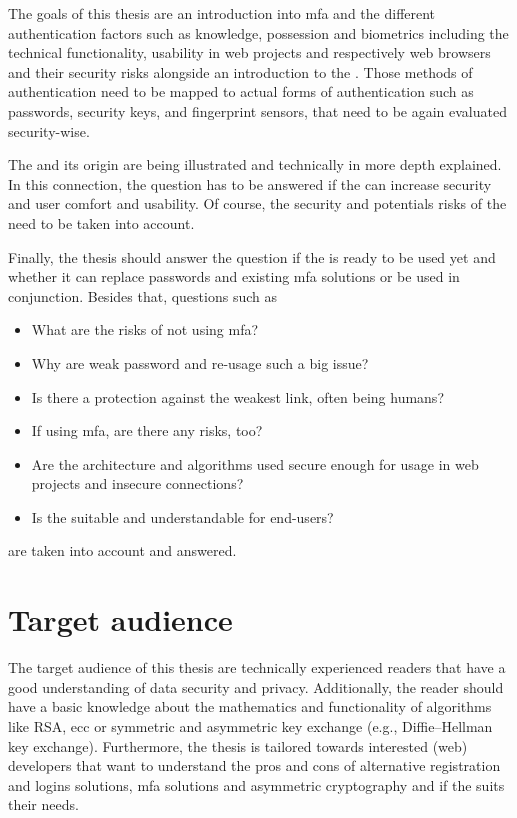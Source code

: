 The goals of this thesis are an introduction into \gls{mfa} and the different authentication factors such as \frqq knowledge, possession and biometrics\flqq{} including the technical functionality, usability in web projects and respectively web browsers and their security risks alongside an introduction to the \wa. Those methods of authentication need to be mapped to actual forms of authentication such as passwords, security keys, and fingerprint sensors, that need to be again evaluated security-wise.

The \wa{} and its origin are being illustrated and technically in more depth explained. In this connection, the question has to be answered if the \wa{} can increase security and user comfort and usability. Of course, the security and potentials risks of the \wa{} need to be taken into account.

Finally, the thesis should answer the question if the \wa{} is ready to be used yet and whether it can replace passwords and existing \gls{mfa} solutions or be used in conjunction.
Besides that, questions such as

\begin{itemize}
	\item What are the risks of not using \gls{mfa}?
	\item Why are weak password and re-usage such a big issue?
	\item Is there a protection against the weakest link, often being humans?
	\item If using \gls{mfa}, are there any risks, too?
	\item Are the architecture and algorithms used secure enough for usage in web projects and insecure connections?
	\item Is the \wa{} suitable and understandable for end-users?
\end{itemize}

are taken into account and answered.

\section{Target audience}

The target audience of this thesis are technically experienced readers that have a good understanding of data security and privacy. Additionally, the reader should have a basic knowledge about the mathematics and functionality of algorithms like RSA, \gls{ecc} or symmetric and asymmetric key exchange (e.g., Diffie–Hellman key exchange). Furthermore, the thesis is tailored towards interested (web) developers that want to understand the pros and cons of alternative registration and logins solutions, \gls{mfa} solutions and asymmetric cryptography and if the \wa{} suits their needs.

